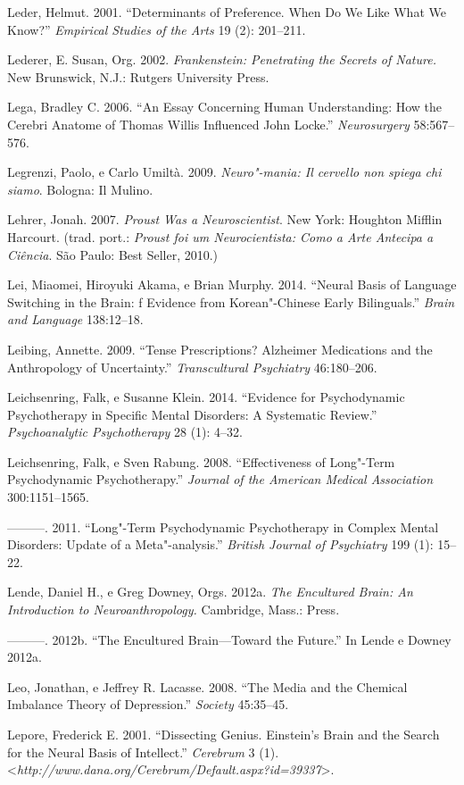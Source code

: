 Leder, Helmut. 2001. ``Determinants of Preference. When Do We Like What
We Know?'' \emph{Empirical Studies of the Arts} 19 (2): 201--211.

Lederer, E. Susan, Org. 2002. \emph{Frankenstein: Penetrating the
Secrets of Nature.} New Brunswick, N.J.: Rutgers University Press.

Lega, Bradley C. 2006. ``An Essay Concerning Human Understanding: How
the Cerebri Anatome of Thomas Willis Influenced John Locke.''
\emph{Neurosurgery} 58:567--576.

Legrenzi, Paolo, e Carlo Umiltà. 2009. \emph{Neuro"-mania: Il cervello
non spiega chi siamo}. Bologna: Il Mulino.

Lehrer, Jonah. 2007. \emph{Proust Was a Neuroscientist}. New York:
Houghton Mifflin Harcourt. (trad. port.: \emph{Proust foi um
Neurocientista: Como a Arte Antecipa a Ciência}. São Paulo: Best Seller,
2010.)

Lei, Miaomei, Hiroyuki Akama, e Brian Murphy. 2014. ``Neural Basis of
Language Switching in the Brain: f Evidence from Korean"-Chinese Early
Bilinguals.'' \emph{Brain and Language} 138:12--18.

Leibing, Annette. 2009. ``Tense Prescriptions? Alzheimer Medications and
the Anthropology of Uncertainty.'' \emph{Transcultural Psychiatry}
46:180--206.

Leichsenring, Falk, e Susanne Klein. 2014. ``Evidence for Psychodynamic
Psychotherapy in Specific Mental Disorders: A Systematic Review.''
\emph{Psychoanalytic Psychotherapy} 28 (1): 4--32.

Leichsenring, Falk, e Sven Rabung. 2008. ``Effectiveness of Long"-Term
Psychodynamic Psychotherapy.'' \emph{Journal of the American Medical
Association} 300:1151--1565.

---------. 2011. ``Long"-Term Psychodynamic Psychotherapy in Complex
Mental Disorders: Update of a Meta"-analysis.'' \emph{British Journal of
Psychiatry} 199 (1): 15--22.

Lende, Daniel H., e Greg Downey, Orgs. 2012a. \emph{The Encultured
Brain: An Introduction to Neuroanthropology.} Cambridge, Mass.: 
Press.

---------. 2012b. ``The Encultured Brain---Toward the Future.'' In Lende
e Downey 2012a.

Leo, Jonathan, e Jeffrey R. Lacasse. 2008. ``The Media and the Chemical
Imbalance Theory of Depression.'' \emph{Society} 45:35--45.

Lepore, Frederick E. 2001. ``Dissecting Genius. Einstein's Brain and the
Search for the Neural Basis of Intellect.'' \emph{Cerebrum} 3 (1).
\textless{}\emph{http://www.dana.org/Cerebrum/Default.aspx?id​=39337}\textgreater{}.

